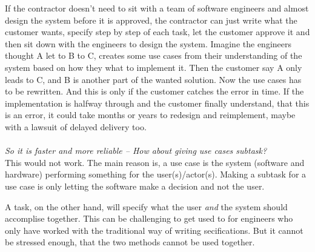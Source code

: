 \documentclass[Main]{subfiles}
\begin{document}
If the contractor doesn't need to sit with a team of software engineers and almost design the system before it is approved, the contractor can just write what the customer wants, specify step by step of each task, let the customer approve it and then sit down with the engineers to design the system.
Imagine the engineers thought A let to B to C, creates some use cases from their understanding of the system based on how they what to implement it. 
Then the customer say A only leads to C, and B is another part of the wanted solution. 
Now the use cases has to be rewritten.
And this is only if the customer catches the error in time. 
If the implementation is halfway through and the customer finally understand, that this is an error, it could take months or years to redesign and reimplement, maybe with a lawsuit of delayed delivery too.
\\
\\
\textit{So it is faster and more reliable -- How about giving use cases subtask?}
\\
This would not work.
The main reason is, a use case is the system (software and hardware) performing something for the user(s)/actor(s).
Making a subtask for a use case is only letting the software make a decision and not the user.

A task, on the other hand, will specify what the user \textit{and} the system should accomplise together.
This can be challenging to get used to for engineers who only have worked with  the traditional way of writing secifications.
But it cannot be stressed enough, that the two methods cannot be used together.
\end{document}
